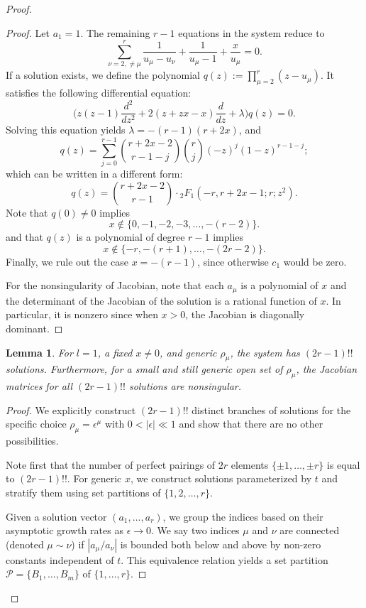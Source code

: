 \documentclass[11pt]{amsart}
\newtheorem{lemma}[theorem]{Lemma}
\theoremstyle{remark}
\numberwithin{equation}{section}
\begin{document}
\begin{proof}
\begin{proof}
Let $a_1=1$. The remaining $r-1$ equations in the system reduce to
\[
    \sum_{\nu=2, \neq \mu}^r \frac{1}{u_\mu-u_\nu} + \frac{1}{u_\mu-1} + \frac{x}{u_\mu} = 0.
\]
If a solution exists, we define the polynomial $q(z) := \prod_{\mu=2}^r (z- u_\mu)$. It satisfies the following differential equation:
\[
    \Big( z(z-1) \frac{d^2}{dz^2} + 2(z + zx -x)\frac{d}{dz} + \lambda \Big) q(z) = 0.
\]
Solving this equation yields $\lambda = -(r-1)(r + 2x)$, and
\[
    q(z) = \sum_{j=0}^{r-1} \binom{r+2x-2}{r-1-j} \binom{r}{j} (-z)^j (1-z)^{r-1-j};
\]
which can be written in a different form:
\[
    q(z) = \binom{r+2x-2}{r-1} \cdot {}_2F_1\left(-r, r+2x-1; r; z^2\right).
\]
Note that $q(0) \neq 0$ implies 
\[
    x \notin \{ 0, -1, -2, -3, \dots, -(r-2) \}.
\]
and that $q(z)$ is a polynomial of degree $r-1$ implies 
\[
    x \notin \{ -r, -(r+1), \dots, -(2r-2) \}.
\]    
Finally, we rule out the case $x = -(r-1)$, since otherwise $c_1$ would be zero.

For the nonsingularity of Jacobian, note that each $a_\mu$ is a polynomial of $x$ and the determinant of the Jacobian of the solution is a rational function of $x$. In particular, it is nonzero since when $x>0$, the Jacobian is diagonally dominant. 
\end{proof}

\begin{lemma} For $l=1$, a fixed $x \neq 0$, and generic $\rho_\mu$, the system has $(2r-1)!!$ solutions. Furthermore, for a small and still generic open set of $\rho_\mu$, the Jacobian matrices for all $(2r-1)!!$ solutions are nonsingular.
\end{lemma}
\begin{proof}
We explicitly construct $(2r-1)!!$ distinct branches of solutions for the specific choice $\rho_\mu = \epsilon^\mu$ with $0 < |\epsilon| \ll 1$ and show that there are no other possibilities. 

Note first that the number of perfect pairings of $2r$ elements $\{\pm 1,\dots, \pm r\}$ is equal to $(2r-1)!!$. 
For generic $x$, we construct solutions parameterized by $t$ and stratify them using set partitions of $\{1, 2, \dots, r\}$.

Given a solution vector $(a_1, \dots, a_r)$, we group the indices based on their asymptotic growth rates as $\epsilon \to 0$. We say two indices $\mu$ and $\nu$ are connected (denoted $\mu \sim \nu$) if $|a_\mu / a_\nu|$ is bounded both below and above by non-zero constants independent of $t$. This equivalence relation yields a set partition $\mathcal{P} = \{B_1, \dots, B_m\}$ of $\{1, \dots, r\}$.


\end{proof}
\end{proof}
\end{document}
